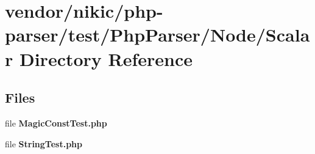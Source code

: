 \section{vendor/nikic/php-\/parser/test/\+Php\+Parser/\+Node/\+Scalar Directory Reference}
\label{dir_8408c347bafc1a60b448e6c4d520267b}
\subsection*{Files}
\begin{DoxyCompactItemize}
\item 
file {\bf Magic\+Const\+Test.\+php}
\item 
file {\bf String\+Test.\+php}
\end{DoxyCompactItemize}

